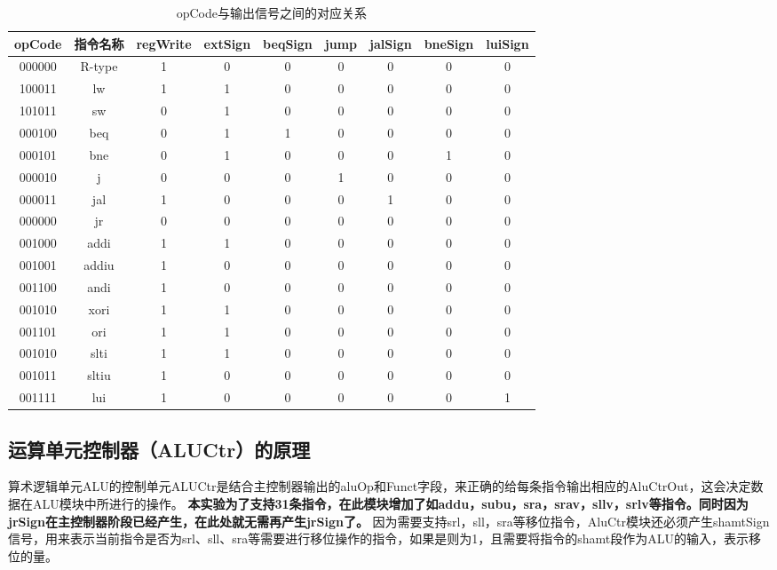 \begin{table}[H]
    \centering
    \begin{tabular}{c|c|c|c|c|c|c|c|c}
    \hline
        opCode & 指令名称 & regWrite & extSign & beqSign & jump & jalSign & bneSign & luiSign \\
        \hline  
        000000 & R-type & 1 & 0 & 0 & 0 & 0 & 0 & 0 \\
        100011 & lw & 1 & 1 & 0 & 0 & 0 & 0 & 0\\
        101011 & sw & 0 & 1 & 0 & 0 & 0 & 0 & 0\\
        000100 & beq &  0 & 1 & 1 & 0 & 0 & 0 & 0\\
        000101 & bne & 0 & 1 & 0 & 0 &  0 &1&0\\
        000010 & j & 0 & 0 & 0 & 1 & 0  & 0 & 0 \\
        000011 & jal & 1 & 0 & 0 & 0 & 1 & 0 & 0\\
        000000 & jr  & 0 & 0 & 0 & 0 & 0 & 0 &0\\
        001000 & addi & 1 & 1 & 0 & 0 & 0 & 0 &0\\
        001001 & addiu & 1 & 0 & 0 & 0 & 0 & 0 &0\\
        001100 & andi & 1 & 0 & 0 & 0 & 0 & 0 &0\\
        001010 & xori & 1 & 1 & 0 & 0 & 0 & 0 &0\\
        001101 & ori & 1 & 1 & 0 & 0 & 0 & 0 &0\\
        001010 & slti & 1 & 1 & 0 & 0 & 0& 0 &0\\
        001011 & sltiu & 1 & 0 & 0 & 0 & 0 & 0 &0\\
        001111 & lui& 1 & 0&0&0&0&0&1\\
        \hline
    \end{tabular}
    \caption{opCode与输出信号之间的对应关系}
    \label{5}
\end{table}



\subsection{运算单元控制器（ALUCtr）的原理}

算术逻辑单元ALU的控制单元ALUCtr是结合主控制器输出的aluOp和Funct字段，来正确的给每条指令输出相应的AluCtrOut，这会决定数据在ALU模块中所进行的操作。
\textbf{本实验为了支持31条指令，在此模块增加了如addu，subu，sra，srav，sllv，srlv等指令。同时因为jrSign在主控制器阶段已经产生，在此处就无需再产生jrSign了。}
因为需要支持srl，sll，sra等移位指令，AluCtr模块还必须产生shamtSign信号，用来表示当前指令是否为srl、sll、sra等需要进行移位操作的指令，如果是则为1，且需要将指令的shamt段作为ALU的输入，表示移位的量。

